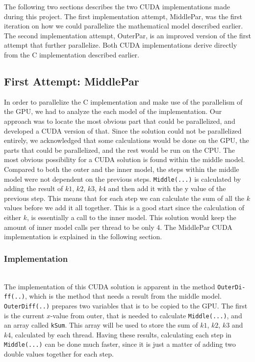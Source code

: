 The following two sections describes the two CUDA implementations made during this project. The first implementation attempt, MiddlePar, was the first iteration on how we could parallelize the mathematical model described earlier. The second implementation attempt, OuterPar, is an improved version of the first attempt that further parallelize. Both CUDA implementations derive directly from the C implementation described earlier.

\subsection{First Attempt: MiddlePar}
In order to parallelize the C implementation and make use of the parallelism of the GPU, we had to analyze the each model of the implementation. Our approach was to locate the most obvious part that could be parallelized, and developed a CUDA version of that. Since the solution could not be parallelized entirely, we acknowledged that some calculations would be done on the GPU, the parts that could be parallelized, and the rest would be run on the CPU. The most obvious possibility for a CUDA solution is found within the middle model. Compared to both the outer and the inner model, the steps within the middle model were not dependent on the previous steps. \texttt{Middle(...)} is calculated by adding the result of $k1$, $k2$, $k3$, $k4$ and then add it with the y value of the previous step. This means that for each step we can calculate the sum of all the $k$ values before we add it all together. This is a good start since the calculation of either $k$, is essentially a call to the inner model. This solution would keep the amount of inner model calls per thread to be only 4. The MiddlePar CUDA implementation is explained in the following section.

\subsubsection{Implementation} \hfill\\
The implementation of this CUDA solution is apparent in the method \texttt{OuterDi-\\ff(..)}, which is the method that needs a result from the middle model. \texttt{OuterDiff(..)} prepares two variables that is to be copied to the GPU. The first is the current $x$-value from outer, that is needed to calculate \texttt{Middle(...)}, and an array called \texttt{kSum}. This array will be used to store the sum of $k1$, $k2$, $k3$ and $k4$, calculated by each thread. Having these results, calculating each step in \texttt{Middle(...)} can be done much faster, since it is just a matter of adding two double values together for each step. \\ \\

